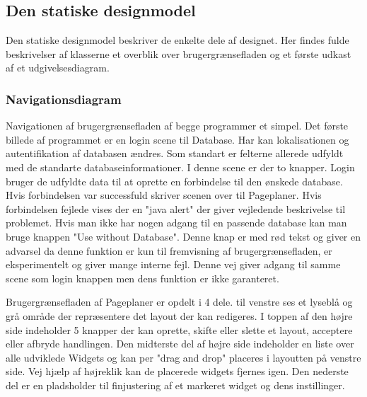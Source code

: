 \subsection{Den statiske designmodel} \label{Statisk designmodel}
Den statiske designmodel beskriver de enkelte dele af designet. Her findes fulde beskrivelser af klasserne et overblik over brugergrænsefladen og et første udkast af et udgivelsesdiagram.


\subsubsection{Navigationsdiagram}

Navigationen af brugergrænsefladen af begge programmer et simpel. Det første billede af programmet er en login scene til Database. Har kan lokalisationen og autentifikation af databasen ændres. Som standart er felterne allerede udfyldt med de standarte databaseinformationer. I denne scene er der to knapper. Login bruger de udfyldte data til at oprette en forbindelse til den ønskede database. Hvis forbindelsen var successfuld skriver scenen over til Pageplaner. Hvis forbindelsen fejlede vises der en "java alert" der giver vejledende beskrivelse til problemet. Hvis man ikke har nogen adgang til en passende database kan man bruge knappen "Use without Database". Denne knap er med rød tekst og giver en advarsel da denne funktion er kun til fremvisning af brugergrænsefladen, er eksperimentelt og giver mange interne fejl. Denne vej giver adgang til samme scene som login knappen men dens funktion er ikke garanteret.

Brugergrænsefladen af Pageplaner er opdelt i 4 dele. til venstre ses et lyseblå og grå område der repræsentere det layout der kan redigeres. I toppen af den højre side indeholder 5 knapper der kan oprette, skifte eller slette et layout, acceptere eller afbryde handlingen. Den midterste del af højre side indeholder en liste over alle udviklede Widgets og kan per "drag and drop" placeres i layoutten på venstre side. Vej hjælp af højreklik kan de placerede widgets fjernes igen. Den nederste del er en pladsholder til finjustering af et markeret widget og dens instillinger.

